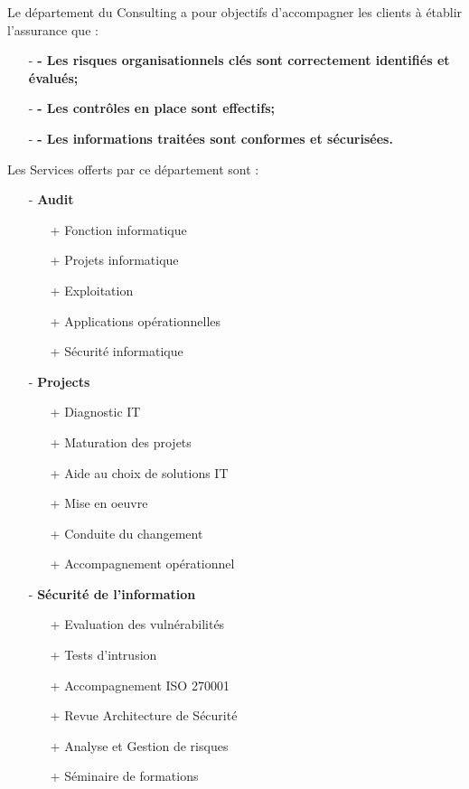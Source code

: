 Le département du Consulting a pour objectifs d’accompagner les clients à établir l’assurance que :
\begin{itemize}
    \item[-] \textbf{-	Les risques organisationnels clés sont correctement identifiés et évalués;}
    \item[-] \textbf{-	Les contrôles en place sont effectifs;}
    \item[-] \textbf{-	Les informations traitées sont conformes et sécurisées.}
\end{itemize}
Les Services offerts par ce département sont :
\begin{itemize}
    \item[-] \textbf{Audit}
    \begin{itemize}
        \item[+] Fonction informatique
        \item[+] Projets informatique
        \item[+] Exploitation
        \item[+] Applications opérationnelles
        \item[+] Sécurité informatique
    \end{itemize}
    \item[-] \textbf{Projects}
    \begin{itemize}
        \item[+] Diagnostic IT
        \item[+] Maturation des projets
        \item[+] Aide au choix de solutions IT
        \item[+] Mise en oeuvre
        \item[+] Conduite du changement
        \item[+] Accompagnement opérationnel
    \end{itemize}
    \item[-] \textbf{Sécurité de l'information}
    \begin{itemize}
        \item[+] Evaluation des vulnérabilités
        \item[+] Tests d'intrusion
        \item[+] Accompagnement ISO 270001
        \item[+] Revue Architecture de Sécurité
        \item[+] Analyse et Gestion de risques
        \item[+] Séminaire de formations
    \end{itemize}
\end{itemize}

